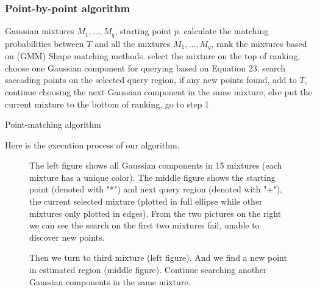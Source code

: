 \documentclass{beamer}
\begin{document}
\begin{frame}
\frametitle{Point-by-point algorithm}
\begin{algorithm}[H]
\begin{algorithmic}[1]
  \REQUIRE Gaussian mixtures $M_1,...,M_q$, starting point $p$.
  \LOOP 
  \STATE calculate the matching probabilities between $T$ and all the mixtures $M_1,...,M_q$, rank the mixtures based on (GMM) Shape matching methods.
  \STATE select the mixture on the top of ranking, choose one Gaussian component for querying based on Equation 23.
  \STATE search saccading points on the selected query region, if any new points found, add to $T$, continue choosing the next Gaussian component in the same mixture, else put the current mixture to the bottom of ranking, go to step 1
  \ENDLOOP
\end{algorithmic}
\caption{Point-matching algorithm}
\end{algorithm}
\end{frame}


\begin{frame}
Here is the execution process of our algorithm.

\begin{figure}
  \centering
  \caption{The left figure shows all Gaussian components in 15 mixtures (each mixture has a unique color). The middle figure shows the starting point (denoted with "*") and next query region (denoted with "+"), the current selected mixture (plotted in full ellipse while other mixtures only plotted in edges). From the two pictures on the right we can see the search on the first two mixtures fail, unable to discover new points.}

\end{figure}   
\end{frame}


\begin{frame}
\begin{figure}
  \caption{Then we turn to third mixture (left figure). And we find a new point in estimated region (middle figure). Continue searching another Gaussian components in the same mixture.}

\end{figure}   
\end{frame}
\end{document}
